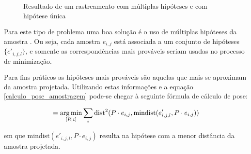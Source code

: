 \begin{figure}[!ht]
	\centerline{
		\hfil
	}
	\caption{Resultado de um rastreamento com múltiplas hipóteses e com hipótese única}
\end{figure}

Para este tipo de problema uma boa solução é o uso de múltiplas hipóteses da amostra \cite{multiplas_hipoteses}. Ou seja, cada amostra $e_{i,j}$ está associada a um conjunto de hipóteses $\{e'_{i,j,l}\}$, e somente as correspondências mais prováveis seriam usadas no processo de minimização.

Para fins práticos as hipóteses mais prováveis são aquelas que mais se aproximam da amostra projetada. Utilizando estas informações e a equação \eqref{calculo_pose_amostragem} pode-se chegar à seguinte fórmula de cálculo de pose:

\begin{equation}
[R | t] = \argmin_{[R | t]} \sum_i \text{dist}^2(P \cdot e_{i,j}, \text{mindist}(e'_{i,j,l}, P \cdot e_{i,j}))
\end{equation}

em que $\text{mindist}(e'_{i,j,l}, P \cdot e_{i,j})$ resulta na hipótese com a menor distância da amostra projetada.


